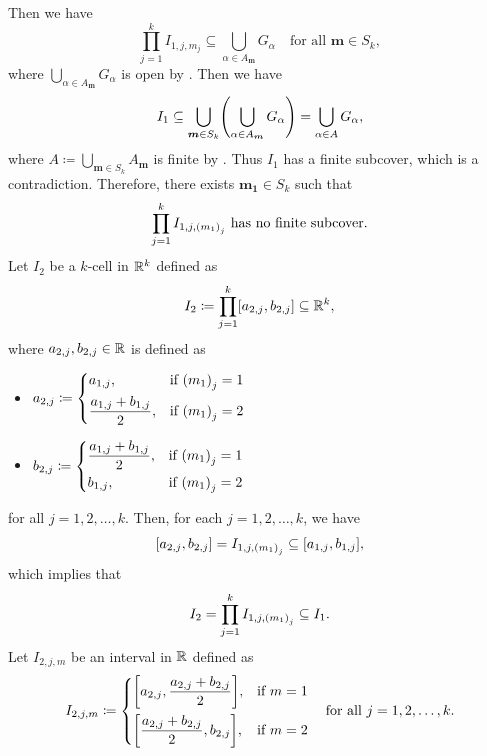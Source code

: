     Then we have
    \[
    \prod_{j = 1}^{k} I_{1, j, m_{j}} \subseteq \bigcup_{\alpha \in A_{\bm{m}}} G_{\alpha}
    \quad \text{for all } \bm{m} \in S_{k},
    \]
    where $\bigcup_{\alpha \in A_{\bm{m}}} G_{\alpha}$ is open by .
    Then we have
    \[
    I_{1} \subseteq \bigcup_{\bm{m} \in S_{k}} \paren*{\bigcup_{\alpha \in A_{\bm{m}}} G_{\alpha}}
    = \bigcup_{\alpha \in A} G_{\alpha},
    \]
    where $A \coloneqq \bigcup_{\bm{m} \in S_{k}} A_{\bm{m}}$ is finite by
    . Thus $I_{1}$ has a finite subcover, which is a contradiction.
    Therefore, there exists $\bm{m_{1}} \in S_{k}$ such that
    \[
    \prod_{j = 1}^{k} I_{1, j, \paren*{m_{1}}_{j}} \text{ has no finite subcover}.
    \]
    Let $I_{2}$ be a $k$-cell in $\R^{k}$ defined as
    \[
    I_{2} \coloneqq \prod_{j = 1}^{k} \bracket{a_{2, j}, b_{2, j}} \subseteq \R^{k},
    \]
    where $a_{2, j}, b_{2, j} \in \R$ is defined as
    \begin{itemize}
        \item $a_{2, j} \coloneqq \begin{dcases}
            a_{1, j}, & \text{if } \paren*{m_{1}}_{j} = 1 \\
            \frac{a_{1, j} + b_{1, j}}{2}, & \text{if } \paren*{m_{1}}_{j} = 2
        \end{dcases}$
        \item $b_{2, j} \coloneqq \begin{dcases}
            \frac{a_{1, j} + b_{1, j}}{2}, & \text{if } \paren*{m_{1}}_{j} = 1 \\
            b_{1, j}, & \text{if } \paren*{m_{1}}_{j} = 2
        \end{dcases}$
    \end{itemize}
    for all $j = 1, 2, \dots, k$. Then, for each $j = 1, 2, \dots, k$, we have
    \[
    \bracket{a_{2, j}, b_{2, j}} = I_{1, j, \paren*{m_{1}}_{j}} \subseteq \bracket{a_{1, j}, b_{1, j}},
    \]
    which implies that
    \[
    I_{2} = \prod_{j = 1}^{k} I_{1, j, \paren*{m_{1}}_{j}} \subseteq I_{1}.
    \]
    Let $I_{2, j, m}$ be an interval in $\R$ defined as
    \[
    I_{2, j, m} \coloneqq \begin{dcases}
        \bracket*{a_{2, j}, \frac{a_{2, j} + b_{2, j}}{2}}, & \text{if } m = 1 \\
        \bracket*{\frac{a_{2, j} + b_{2, j}}{2}, b_{2, j}}, & \text{if } m = 2
    \end{dcases} \quad \text{for all } j = 1, 2, \dots, k.
    \]
